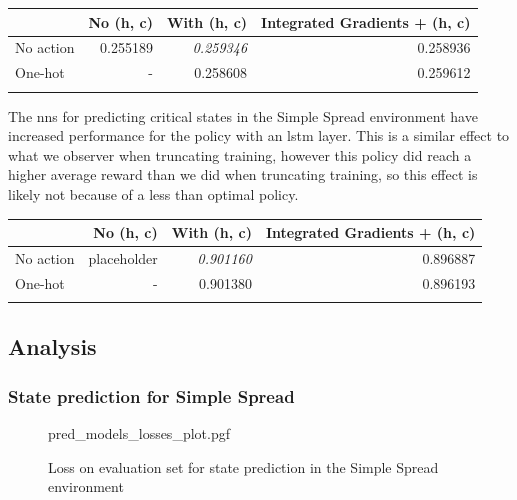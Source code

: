 \documentclass[UKenglish]{uiomasterthesis}
\begin{document}
\begin{center}
\label{tab:state_simpl_lstm}
\begin{tabular}{lrrr}
\toprule
    & No (h, c) & With (h, c) & Integrated Gradients + (h, c)\\
\midrule
    No action & 0.255189 & \textit{0.259346} & 0.258936 \\
    One-hot & - & 0.258608 & 0.259612 \\
\bottomrule
\addlinespace[2pt]
\end{tabular}
\end{center}

The \acp{nn} for predicting critical states in the Simple Spread environment have increased performance for the policy with an \ac{lstm} layer. This is a similar effect to what we observer when truncating training, however this policy did reach a higher average reward than we did when truncating training, so this effect is likely not because of a less than optimal policy.

\begin{center}
\label{tab:event_simpl_lstm}
\begin{tabular}{lrrr}
\toprule
    & No (h, c) & With (h, c) & Integrated Gradients + (h, c)\\
\midrule
    No action & placeholder & \textit{0.901160} & 0.896887 \\
    One-hot & - & 0.901380 & 0.896193 \\
\bottomrule
\addlinespace[2pt]
\multicolumn{3}{l}{\textsuperscript{***}$p<0.001$, 
  \textsuperscript{**}$p<0.01$, 
  \textsuperscript{*}$p<0.05$}
\end{tabular}
\end{center}



\subsection{Analysis}
\subsubsection{State prediction for Simple Spread}

\begin{figure}[hbtp]
    \centering
    {pred_models_losses_plot.pgf}
    \caption{Loss on evaluation set for state prediction in the Simple Spread environment}
	\label{fig:pred_losses_lstm}
\end{figure}
\end{document}
